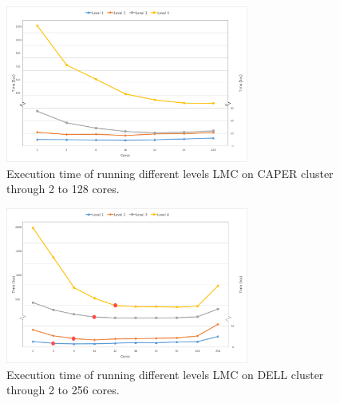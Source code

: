 \documentclass[10pt, conference, compsocconf]{IEEEtran}
\begin{document}
\noindent
\begin{figure}[H]
	\centering
    \includegraphics[width=8cm]{figs/CAPER_lev1-4_run_time_edited.jpg}
        \caption{Execution time of running different levels LMC on CAPER cluster through 2 to 128 cores. }
        \label{fig:executiontimeoncaper}
\end{figure}

\begin{figure}[H]
	\centering
    \includegraphics[width=8cm]{figs/Dell_lev1-4_run_time_edited.jpg}
        \caption{Execution time of running different levels LMC on DELL cluster through 2 to 256 cores. }
        \label{fig:executiontimeondell}
\end{figure}

\end{document}
